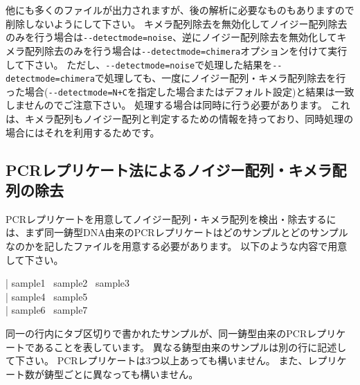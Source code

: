 \documentclass[titlepage,10pt,a4paper,english]{jsbook}
\newenvironment{content}{\begin{shaded}\vspace{-1em}\raggedright\ttfamily\footnotesize\setlength{\baselineskip}{1.4em}}{\end{shaded}\vspace{-1em}}
\begin{document}
他にも多くのファイルが出力されますが、後の解析に必要なものもありますので削除しないようにして下さい。
キメラ配列除去を無効化してノイジー配列除去のみを行う場合は\texttt{{-}{-}detectmode=noise}、逆にノイジー配列除去を無効化してキメラ配列除去のみを行う場合は\texttt{{-}{-}detectmode=chimera}オプションを付けて実行して下さい。
ただし、\texttt{{-}{-}detectmode=noise}で処理した結果を\texttt{{-}{-}detectmode=chimera}で処理しても、一度にノイジー配列・キメラ配列除去を行った場合(\texttt{{-}{-}detectmode=N+C}を指定した場合またはデフォルト設定)と結果は一致しませんのでご注意下さい。
処理する場合は同時に行う必要があります。
これは、キメラ配列もノイジー配列と判定するための情報を持っており、同時処理の場合にはそれを利用するためです。

\subsection{PCRレプリケート法によるノイジー配列・キメラ配列の除去}

PCRレプリケートを用意してノイジー配列・キメラ配列を検出・除去するには、まず同一鋳型DNA由来のPCRレプリケートはどのサンプルとどのサンプルなのかを記したファイルを用意する必要があります。
以下のような内容で用意して下さい。
\begin{content}
| sample1~ sample2~ sample3\\
| sample4~ sample5\\
| sample6~ sample7
\end{content}
同一の行内にタブ区切りで書かれたサンプルが、同一鋳型由来のPCRレプリケートであることを表しています。
異なる鋳型由来のサンプルは別の行に記述して下さい。
PCRレプリケートは3つ以上あっても構いません。
また、レプリケート数が鋳型ごとに異なっても構いません。
\end{document}

